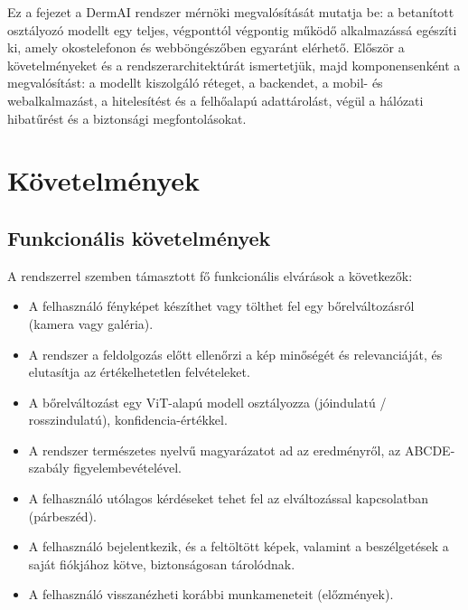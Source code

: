 
Ez a fejezet a DermAI rendszer mérnöki megvalósítását mutatja be: a betanított
osztályozó modellt egy teljes, végponttól végpontig működő alkalmazássá
egészíti ki, amely okostelefonon és webböngészőben egyaránt elérhető. Először a
követelményeket és a rendszerarchitektúrát ismertetjük, majd komponensenként a
megvalósítást: a modellt kiszolgáló réteget, a backendet, a mobil- és
webalkalmazást, a hitelesítést és a felhőalapú adattárolást, végül a hálózati
hibatűrést és a biztonsági megfontolásokat.

\section{Követelmények}

\subsection{Funkcionális követelmények}

A rendszerrel szemben támasztott fő funkcionális elvárások a következők:

\begin{itemize}
  \item A felhasználó fényképet készíthet vagy tölthet fel egy
  bőrelváltozásról (kamera vagy galéria).
  \item A rendszer a feldolgozás előtt ellenőrzi a kép minőségét és
  relevanciáját, és elutasítja az értékelhetetlen felvételeket.
  \item A bőrelváltozást egy ViT-alapú modell osztályozza
  (jó\-indulatú / rosszindulatú), konfidencia-értékkel.
  \item A rendszer természetes nyelvű magyarázatot ad az eredményről, az
  ABCDE-szabály figyelembevételével.
  \item A felhasználó utólagos kérdéseket tehet fel az elváltozással
  kapcsolatban (párbeszéd).
  \item A felhasználó bejelentkezik, és a feltöltött képek, valamint a
  beszélgetések a saját fiókjához kötve, biztonságosan tárolódnak.
  \item A felhasználó visszanézheti korábbi munkameneteit (előzmények).
\end{itemize}

